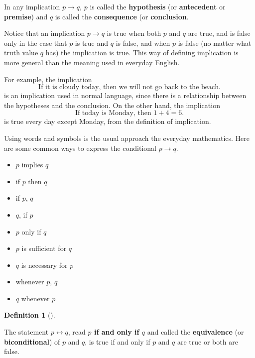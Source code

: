 \documentclass[
  letterpaper,
  10pt,
  reqno,
  twopage,
  openany]{book}
\providecommand{\tightlist}{%
  \setlength{\itemsep}{0pt}\setlength{\parskip}{0pt}}\usepackage{longtable,booktabs,array}
\theoremstyle{plain}
\theoremstyle{definition}
\theoremstyle{definition}
\newtheorem{definition}{Definition}[chapter]
\theoremstyle{definition}
\theoremstyle{plain}
\theoremstyle{plain}
\theoremstyle{remark}
\begin{document}
In any implication \(p\rightarrow q\), \(p\) is called the
 \textbf{hypothesis} (or 
\textbf{antecedent} or  \textbf{premise}) and \(q\) is
called the  \textbf{consequence} (or
 \textbf{conclusion}.

Notice that an implication \(p\rightarrow q\) is true when both \(p\)
and \(q\) are true, and is false only in the case that \(p\) is true and
\(q\) is false, and when \(p\) is false (no matter what truth value
\(q\) has) the implication is true. This way of defining implication is
more general than the meaning used in everyday English.

For example, the implication \[
\text{If it is cloudy today, then we will not go back to the beach.}
\] is an implication used in normal language, since there is a
relationship between the hypotheses and the conclusion. On the other
hand, the implication \[
\text{If today is Monday, then $1+4=6$.}
\] is true every day except Monday, from the definition of implication.

Using words and symbols is the usual approach the everyday mathematics.
Here are some common ways to express the conditional \(p\rightarrow q\).

\begin{itemize}
\tightlist
\item
  \(p\) implies \(q\)
\item
  if \(p\) then \(q\)
\item
  if \(p\), \(q\)
\item
  \(q\), if \(p\)
\item
  \(p\) only if \(q\)
\item
  \(p\) is sufficient for \(q\)
\item
  \(q\) is necessary for \(p\)
\item
  whenever \(p\), \(q\)
\item
  \(q\) whenever \(p\)
\end{itemize}

\leavevmode{}%
\begin{definition}[]\label{def-equivalence}

\label{defbicond} The statement \(p\leftrightarrow q\), read
\textbf{\(p\) if and only if \(q\)} and called the 
\textbf{equivalence} (or  \textbf{biconditional})
of \(p\) and \(q\), is true if and only if \(p\) and \(q\) are true or
both are false.

\end{definition}
\end{document}
